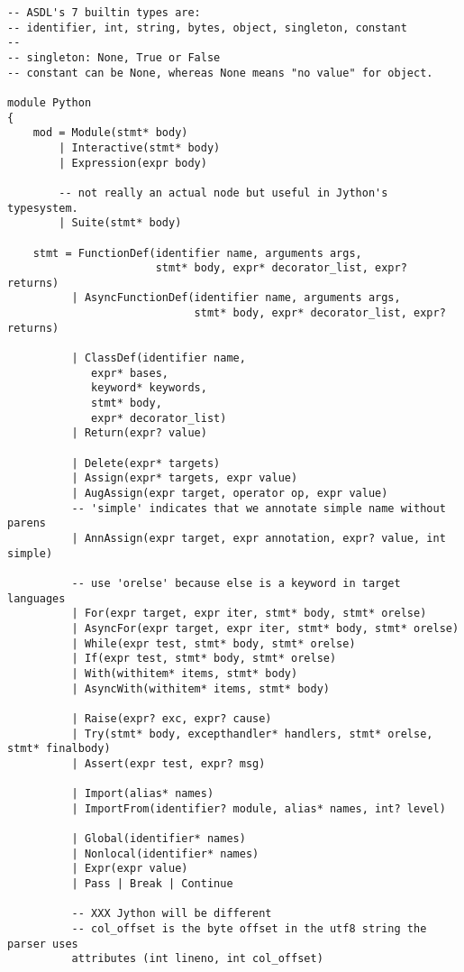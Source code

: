 \begin{verbatim}
-- ASDL's 7 builtin types are:
-- identifier, int, string, bytes, object, singleton, constant
--
-- singleton: None, True or False
-- constant can be None, whereas None means "no value" for object.

module Python
{
    mod = Module(stmt* body)
        | Interactive(stmt* body)
        | Expression(expr body)

        -- not really an actual node but useful in Jython's typesystem.
        | Suite(stmt* body)

    stmt = FunctionDef(identifier name, arguments args,
                       stmt* body, expr* decorator_list, expr? returns)
          | AsyncFunctionDef(identifier name, arguments args,
                             stmt* body, expr* decorator_list, expr? returns)

          | ClassDef(identifier name,
             expr* bases,
             keyword* keywords,
             stmt* body,
             expr* decorator_list)
          | Return(expr? value)

          | Delete(expr* targets)
          | Assign(expr* targets, expr value)
          | AugAssign(expr target, operator op, expr value)
          -- 'simple' indicates that we annotate simple name without parens
          | AnnAssign(expr target, expr annotation, expr? value, int simple)

          -- use 'orelse' because else is a keyword in target languages
          | For(expr target, expr iter, stmt* body, stmt* orelse)
          | AsyncFor(expr target, expr iter, stmt* body, stmt* orelse)
          | While(expr test, stmt* body, stmt* orelse)
          | If(expr test, stmt* body, stmt* orelse)
          | With(withitem* items, stmt* body)
          | AsyncWith(withitem* items, stmt* body)

          | Raise(expr? exc, expr? cause)
          | Try(stmt* body, excepthandler* handlers, stmt* orelse, stmt* finalbody)
          | Assert(expr test, expr? msg)

          | Import(alias* names)
          | ImportFrom(identifier? module, alias* names, int? level)

          | Global(identifier* names)
          | Nonlocal(identifier* names)
          | Expr(expr value)
          | Pass | Break | Continue

          -- XXX Jython will be different
          -- col_offset is the byte offset in the utf8 string the parser uses
          attributes (int lineno, int col_offset)


\end{verbatim}

